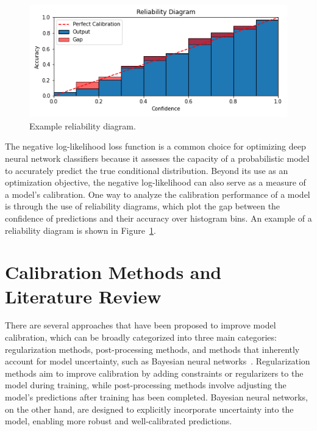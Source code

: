 \begin{figure}[h]
	\centering
	\includegraphics[width=\textwidth]{images/reliability_diagram.png}
	\caption{Example reliability diagram.}
	\label{fig:reliability_diagram}
\end{figure}

The negative log-likelihood loss function is a common choice for optimizing deep neural network classifiers because it assesses the capacity of a probabilistic model to accurately predict the true conditional distribution. Beyond its use as an optimization objective, the negative log-likelihood can also serve as a measure of a model's calibration. One way to analyze the calibration performance of a model is through the use of reliability diagrams, which plot the gap between the confidence of predictions and their accuracy over histogram bins. An example of a reliability diagram is shown in Figure~\ref{fig:reliability_diagram}.



\section{Calibration Methods and Literature Review}
\label{sec:calibration_review}
There are several approaches that have been proposed to improve model calibration, which can be broadly categorized into three main categories: regularization methods, post-processing methods, and methods that inherently account for model uncertainty, such as Bayesian neural networks~\cite{gawlikowski2021survey}. Regularization methods aim to improve calibration by adding constraints or regularizers to the model during training, while post-processing methods involve adjusting the model's predictions after training has been completed. Bayesian neural networks, on the other hand, are designed to explicitly incorporate uncertainty into the model, enabling more robust and well-calibrated predictions.


